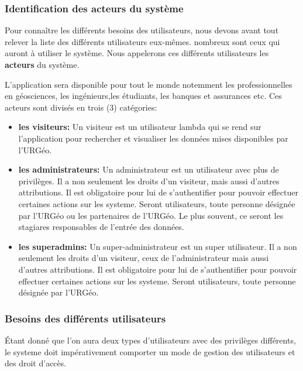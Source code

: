                \subsubsection{Identification des acteurs du système}
                Pour connaître les différents besoins des utilisateurs, nous devons
                avant tout relever la liste des différents utilisateurs eux-mêmes.
                nombreux sont ceux qui auront à utiliser le système. Nous appelerons ces différents
                utilisateurs  les \textbf{acteurs} du système.
                \par
                L'application sera disponible pour tout le monde notemment les
                professionnelles en géosciences, les ingénieurs,les étudiants, les banques et assurances etc.
                Ces acteurs sont divisés en trois (3) catégories:
                \begin{itemize} 
                        \item \textbf{les visiteurs: }
                        Un visiteur est un utilisateur lambda qui se rend sur l'application pour rechercher et visualiser
                        les données mises disponibles par l'URGéo. 
                      
                        \item \textbf{les administrateurs: }
                        Un administrateur est un utilisateur avec plus de privilèges. Il a non seulement les droits d'un visiteur,
                        mais aussi d'autres attributions. Il est obligatoire pour lui de s'authentifier pour pouvoir 
                        effectuer certaines actions sur les systeme. Seront utilisateurs, toute personne désignée par l'URGéo
                        ou les partenaires de l'URGéo. Le plus souvent, ce seront les stagiares responsables de l'entrée des données.

                        \item \textbf{les superadmins: }
                        Un super-administrateur est un super utilisateur. Il a non seulement les droits d'un visiteur,
                        ceux de l'administrateur mais aussi d'autres attributions. Il est obligatoire pour lui de s'authentifier pour pouvoir 
                        effectuer certaines actions sur les systeme. Seront utilisateurs, toute personne désignée par l'URGéo.
                    \end{itemize}   
                \subsubsection{Besoins des différents utilisateurs}
                Étant donné que l'on aura deux types d'utilisateurs avec des privilèges différents,
                le systeme doit impérativement comporter un mode de gestion des utilisateurs et des droit d'accès.
